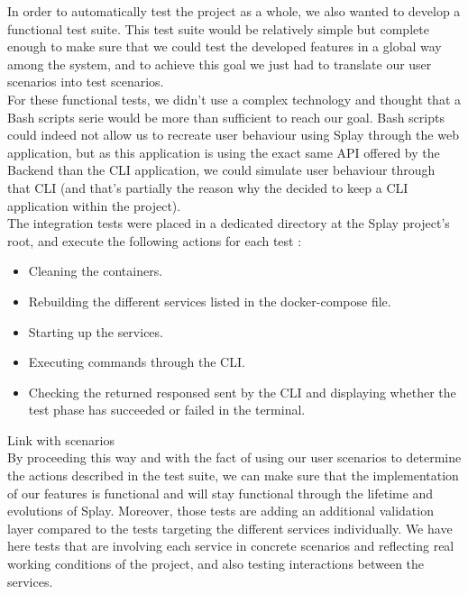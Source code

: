 \documentclass{eplmastersthesis}
\begin{document}
      In order to automatically test the project as a whole, we also wanted to
      develop a functional test suite. This test suite would be relatively
      simple but complete enough to make sure that we could test the developed
      features in a global way among the system, and to achieve this goal we
      just had to translate our user scenarios into test scenarios.\\

      For these functional tests, we didn't use a complex technology and
      thought that a Bash scripts serie would be more than sufficient to
      reach our goal. Bash scripts could indeed not allow us to recreate user
      behaviour using Splay through the web application, but as this
      application is using the exact same API offered by the Backend than the
      CLI application, we could simulate user behaviour through that CLI (and
      that's partially the reason why the decided to keep a CLI application
      within the project).\\

      The integration tests were placed in a dedicated directory at the Splay
      project's root, and execute the following actions for each test :

      \begin{itemize}
        \item Cleaning the containers.
        \item Rebuilding the different services listed in the docker-compose
        file.
        \item Starting up the services.
        \item Executing commands through the CLI.
        \item Checking the returned responsed sent by the CLI and displaying
        whether the test phase has succeeded or failed in the terminal.
      \end{itemize}

      {\color{red} Link with scenarios}\\

      By proceeding this way and with the fact of using our user scenarios to
      determine the actions described in the test suite, we can make sure
      that the implementation of our features is functional and will stay
      functional through the lifetime and evolutions of Splay. Moreover, those
      tests are adding an additional validation layer compared to the tests
      targeting the different services individually. We have here tests that
      are involving each service in concrete scenarios and reflecting real
      working conditions of the project, and also testing interactions
      between the services.
\end{document}
